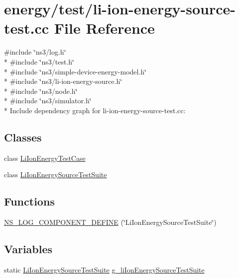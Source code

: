 \hypertarget{li-ion-energy-source-test_8cc}{}\section{energy/test/li-\/ion-\/energy-\/source-\/test.cc File Reference}
\label{li-ion-energy-source-test_8cc}
{\ttfamily \#include \char`\"{}ns3/log.\+h\char`\"{}}\\*
{\ttfamily \#include \char`\"{}ns3/test.\+h\char`\"{}}\\*
{\ttfamily \#include \char`\"{}ns3/simple-\/device-\/energy-\/model.\+h\char`\"{}}\\*
{\ttfamily \#include \char`\"{}ns3/li-\/ion-\/energy-\/source.\+h\char`\"{}}\\*
{\ttfamily \#include \char`\"{}ns3/node.\+h\char`\"{}}\\*
{\ttfamily \#include \char`\"{}ns3/simulator.\+h\char`\"{}}\\*
Include dependency graph for li-\/ion-\/energy-\/source-\/test.cc\+:
\subsection*{Classes}
\begin{DoxyCompactItemize}
\item 
class \hyperlink{classLiIonEnergyTestCase}{Li\+Ion\+Energy\+Test\+Case}
\item 
class \hyperlink{classLiIonEnergySourceTestSuite}{Li\+Ion\+Energy\+Source\+Test\+Suite}
\end{DoxyCompactItemize}
\subsection*{Functions}
\begin{DoxyCompactItemize}
\item 
\hyperlink{li-ion-energy-source-test_8cc_a001534191f93e2157bca05112a84b9cd}{N\+S\+\_\+\+L\+O\+G\+\_\+\+C\+O\+M\+P\+O\+N\+E\+N\+T\+\_\+\+D\+E\+F\+I\+NE} (\char`\"{}Li\+Ion\+Energy\+Source\+Test\+Suite\char`\"{})
\end{DoxyCompactItemize}
\subsection*{Variables}
\begin{DoxyCompactItemize}
\item 
static \hyperlink{classLiIonEnergySourceTestSuite}{Li\+Ion\+Energy\+Source\+Test\+Suite} \hyperlink{li-ion-energy-source-test_8cc_a693e3d3e924641bfe0fa4c1066fa2188}{g\+\_\+li\+Ion\+Energy\+Source\+Test\+Suite}
\end{DoxyCompactItemize}


